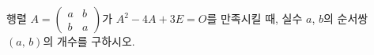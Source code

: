 \hspace*{2mm}\begin{minipage}[t]{\dimexpr\linewidth-2mm\relax}\vspace{0pt}
행렬 $A=\begin{pmatrix} a & b \\ b & a \end{pmatrix}$가 $A^2-4A+3E=O$를 만족시킬 때, 실수 $a$, $b$의 순서쌍 $(a,\,b)$의 개수를 구하시오. \end{minipage}
